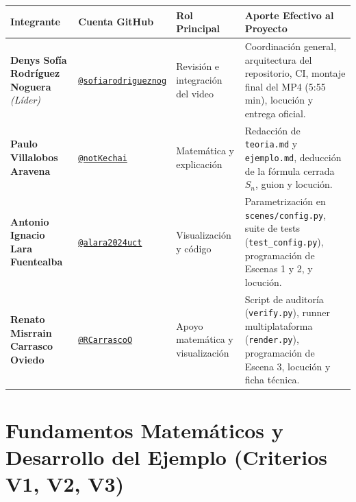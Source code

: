 \documentclass[10pt, a4paper]{article}
\begin{document}
\begin{tabularx}{\textwidth}{@{} p{4.0cm} p{3.4cm} p{3.2cm} Y @{}}
\toprule
\textbf{Integrante} & \textbf{Cuenta GitHub} & \textbf{Rol Principal} & \textbf{Aporte Efectivo al Proyecto} \\
\midrule
\textbf{Denys Sofía Rodríguez Noguera} \textit{(Líder)} & \href{https://github.com/sofiarodrigueznog}{\texttt{@sofiarodrigueznog}} & Revisión e integración del video & Coordinación general, arquitectura del repositorio, CI, montaje final del MP4 (5:55 min), locución y entrega oficial. \\
\textbf{Paulo Villalobos Aravena} & \href{https://github.com/notKechai}{\texttt{@notKechai}} & Matemática y explicación & Redacción de \texttt{teoria.md} y \texttt{ejemplo.md}, deducción de la fórmula cerrada $S_n$, guion y locución. \\
\textbf{Antonio Ignacio Lara Fuentealba} & \href{https://github.com/alara2024uct}{\texttt{@alara2024uct}} & Visualización y código & Parametrización en \texttt{scenes/config.py}, suite de tests (\texttt{test\_config.py}), programación de Escenas 1 y 2, y locución. \\
\textbf{Renato Misrrain Carrasco Oviedo} & \href{https://github.com/RCarrascoO}{\texttt{@RCarrascoO}} & Apoyo matemática y visualización & Script de auditoría (\texttt{verify.py}), runner multiplataforma (\texttt{render.py}), programación de Escena 3, locución y ficha técnica. \\
\bottomrule
\end{tabularx}

\section{Fundamentos Matemáticos y Desarrollo del Ejemplo (Criterios V1, V2, V3)}
\end{document}
